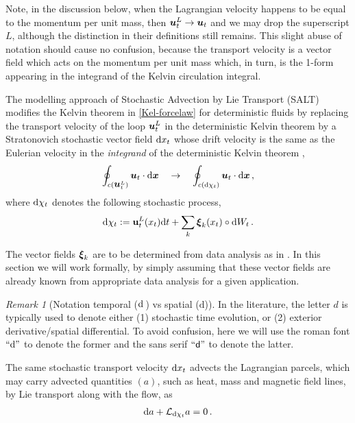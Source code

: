 \documentclass[11pt, oneside]{article}   	%
\numberwithin{equation}{section}
\theoremstyle{plain}
\theoremstyle{definition}
\theoremstyle{remark}
\newtheorem{remark}[theorem]{Remark}
\newcommand{\<}{\langle}
\renewcommand{\>}{\rangle}
\def\diff{\textnormal{d}}
\def\u{{\bf{u}}}
\def\rmd{{\mathrm{d}}}
\newcommand{\mb}[1]{\mbox{\boldmath{$#1$}}}
\begin{document}
Note, in the discussion below, when the Lagrangian velocity happens to be equal to the momentum per unit mass, then $\mb{u}_t^L\to \mb{u}_t$ and we may drop the superscript $L$, although the distinction in their definitions still remains. This slight abuse of notation should cause no confusion, because the transport velocity is a vector field which acts on the momentum per unit mass which, in turn, is the 1-form appearing in the integrand of the Kelvin circulation integral. 
\bigskip

The modelling approach of Stochastic Advection by Lie Transport (SALT) modifies the Kelvin theorem in \eqref{Kel-forcelaw} for deterministic fluids by replacing the transport velocity of the loop $\mb{u}_t^L$ in the deterministic Kelvin theorem by a Stratonovich stochastic vector field ${\rm d} x_t$ whose drift velocity is the same as the Eulerian velocity in the \emph{integrand} of the deterministic Kelvin theorem  \cite{Holm2015},
\begin{align}\label{SALT-Kel}
\oint_{c(\mb u^L_t)} \mb u_t\cdot {\rmd} \mb x
\quad\to\quad 
\oint_{c(\diff \chi_t)}
\mb u_t\cdot {\rmd} \mb x\,,
\end{align}
where $\diff \chi_t$ denotes the following stochastic process,
\begin{align}\label{dx-form}
\diff {\chi_t} := \u^L_t (x_t)\diff t+ \displaystyle\sum_k \mb{\xi}_k (x_t)\circ \diff W_t
\,.
\end{align}

The vector fields $\mb{\xi}_k$ are to be determined from data analysis as in  \cite{CCHOS18b,CCHOS18a}. In this section we will work formally, by simply assuming that these vector fields are already known from appropriate data analysis for a given application.

\begin{remark}[Notation temporal ($\diff$\,) vs spatial (${\rmd}$)]
In the literature, the letter $d$ is typically used to denote either (1) stochastic time evolution, or (2) exterior derivative/spatial differential.
To avoid confusion, here we will use the roman font $``\diff"$ to denote the former and the sans serif $``\sf{d}"$ to denote the latter.
\end{remark}

The same stochastic transport velocity ${\diff } x_t$ advects the Lagrangian parcels, which may carry advected quantities $(a)$, such as heat, mass and magnetic field lines, by Lie transport along with the flow, as
 \cite{HMR1998}
 \begin{align}\label{advec-qty}
\diff  {a} + \mathcal{L}_{\diff  {\chi_t} }a = 0\,.
\end{align}
\end{document}
